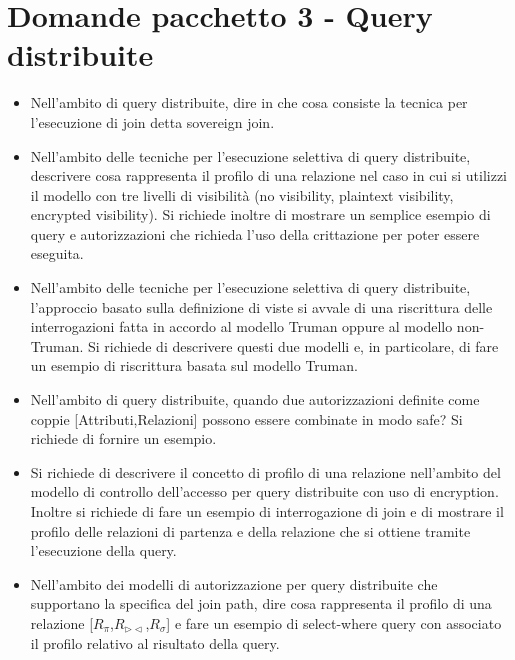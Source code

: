 \documentclass{report}
\begin{document}
\chapter{Domande pacchetto 3 - Query distribuite}
\begin{itemize}
    \item Nell'ambito di query distribuite, dire in che cosa consiste la tecnica per l'esecuzione di join detta sovereign join.
    \item Nell'ambito delle tecniche per l'esecuzione selettiva di query distribuite, descrivere cosa rappresenta il profilo
di una relazione nel caso in cui si utilizzi il modello con tre livelli di visibilità (no visibility, plaintext visibility,
encrypted visibility). Si richiede inoltre di mostrare un semplice esempio di query e autorizzazioni che richieda
l'uso della crittazione per poter essere eseguita.
    \item Nell'ambito delle tecniche per l'esecuzione selettiva di query distribuite, l'approccio basato sulla definizione di
viste si avvale di una riscrittura delle interrogazioni fatta in accordo al modello Truman oppure al modello
non-Truman. Si richiede di descrivere questi due modelli e, in particolare, di fare un esempio di riscrittura
basata sul modello Truman.
    \item Nell'ambito di query distribuite, quando due autorizzazioni definite come coppie [Attributi,Relazioni] possono
essere combinate in modo safe? Si richiede di fornire un esempio.
    \item Si richiede di descrivere il concetto di profilo di una relazione nell'ambito del modello di controllo dell'accesso
per query distribuite con uso di encryption. Inoltre si richiede di fare un esempio di interrogazione di join e di
mostrare il profilo delle relazioni di partenza e della relazione che si ottiene tramite l'esecuzione della query.
    \item Nell'ambito dei modelli di autorizzazione per query distribuite che supportano la specifica del join path, dire
cosa rappresenta il profilo di una relazione [$R_\pi$,$R_{\triangleright\triangleleft}$,$R_\sigma$] e fare un esempio di select-where query con associato
il profilo relativo al risultato della query.
\end{itemize}
\end{document}
